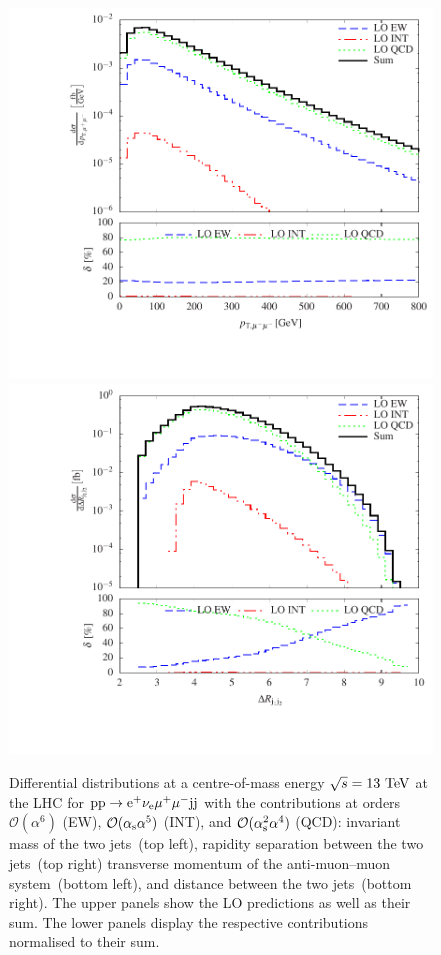 \documentclass[11pt]{cernrep}
\begin{document}
\begin{figure}[htbp]
\begin{center}
   \includegraphics[scale=0.5]{figs/histogram_transverse_momentum_muamu}
   \includegraphics[scale=0.5]{figs/histogram_distance_djj12}
\caption{Differential distributions at a centre-of-mass energy $\sqrt{s}=13{\rm~TeV}$ at the LHC for ${\rm p} {\rm p} \to {\rm e}^+  \nu_{\rm e}  \mu^+ \mu^- {\rm j} {\rm j}$ 
with the contributions at orders $\mathcal{O} (\alpha^6)$ (EW), $\mathcal{O} (\alpha_{\rm s}\alpha^5)$ (INT), and $\mathcal{O} (\alpha_{\rm s}^2\alpha^4)$ (QCD): 
                invariant mass of the two jets~(top left),
                rapidity separation between the two jets~(top right)
                transverse momentum of the anti-muon--muon system~(bottom left), and
                distance between the two jets~(bottom right).
                The upper panels show the LO predictions as well as their sum.
                The lower panels display the respective contributions normalised to their sum.}
\label{fig:diffcontr}
\end{center}
\end{figure}
\end{document}
